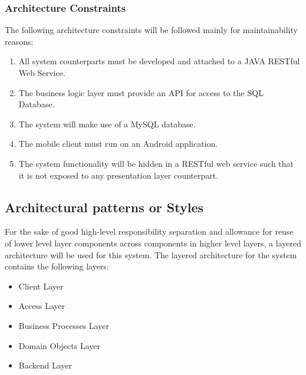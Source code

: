 \documentclass[12pt]{article}
\begin{document}
                			\subsubsection{Architecture Constraints}
                					The following architecture constraints will be followed mainly for maintainability reasons:
                					\begin{enumerate}
                							\item All system counterparts must be developed and attached to a JAVA RESTful Web Service.
                							\item The business logic layer must provide an API for access to the SQL Database.
                							\item The system will make use of a MySQL database.
                							\item The mobile client must run on an Android application.
                							\item The system functionality will be hidden in a RESTful web service such that it is not exposed to any presentation layer counterpart.
                					\end{enumerate}
                				
                			  
                	\subsection{Architectural patterns or Styles}
                			For the sake of good high-level responsibility separation and allowance for reuse of lower level layer components across components in higher level layers, a layered architecture will be used for this system.
                			The layered architecture for the system contains the following layers:
                			\begin{itemize}
		                			\item Client Layer
		                			\item Access Layer
		                			\item Business Processes Layer
		                			\item Domain Objects Layer
		                			\item Backend Layer
                			\end{itemize} 
                			
\end{document}
